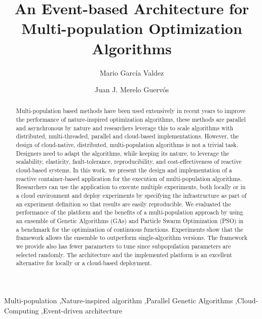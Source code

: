 \documentclass[review]{elsarticle}
\begin{document}
\begin{frontmatter}

\title{An Event-based Architecture for Multi-population Optimization Algorithms}

\author[itt]{Mario Garc\'ia Valdez}

\author[granada]{Juan J. Merelo Guerv\'os}

\address[itt]{Department of Graduate Studies, Instituto Tecnol\'ogico de Tijuana, Tijuana BC, Mexico}
\address[granada]{Universidad de Granada, Granada, Spain}

\begin{abstract} 
Multi-population based methods have been used extensively in
recent years to improve the performance of nature-inspired optimization
algorithms, these methods are parallel and asynchronous by nature and researchers
leverage this to scale algorithms %
with distributed, multi-threaded,
parallel and cloud-based implementations. However, the design  of cloud-native,  distributed, multi-population algorithms is not a trivial task. Designers need to adapt the algorithms, while keeping its nature, to
leverage the scalability, elasticity, fault-tolerance,
reproducibility, and cost-effectiveness of reactive cloud-based systems. %
In this
work, we present the design and implementation of a reactive container-based
application for the execution of multi-population algorithms. Researchers can
use the application to execute multiple experiments, both locally or in a cloud
environment and deploy experiments by specifying the infrastructure as part of
an experiment definition so that results are easily reproducible. We
evaluated the performance of the platform and the benefits of a multi-population
approach by using an ensemble of Genetic Algorithms (GAs) and Particle Swarm
Optimization (PSO) in a benchmark for the optimization of continuous functions.
Experiments show that the framework allows the ensemble to outperform
single-algorithm versions. The framework we provide also has fewer parameters to
tune since subpopulation parameters are selected randomly. The architecture and
the implemented platform is an excellent alternative for locally or a
cloud-based deployment.
\end{abstract}

\begin{keyword}
Multi-population \sep Nature-inspired algorithm \sep Parallel Genetic Algorithms \sep Cloud-Computing
\sep Event-driven architecture 
\end{keyword}

\end{frontmatter}
\end{document}
